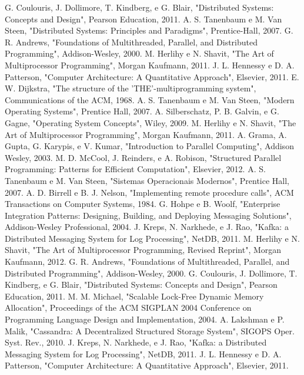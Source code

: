 \documentclass[conference]{IEEEtran}
\begin{document}
\begin{thebibliography}{00} 
     G. Coulouris, J. Dollimore, T. Kindberg, e G. Blair, "Distributed Systems: Concepts and Design", Pearson Education, 2011.
     A. S. Tanenbaum e M. Van Steen, "Distributed Systems: Principles and Paradigms", Prentice-Hall, 2007.
     G. R. Andrews, "Foundations of Multithreaded, Parallel, and Distributed Programming", Addison-Wesley, 2000.
     M. Herlihy e N. Shavit, "The Art of Multiprocessor Programming", Morgan Kaufmann, 2011.
     J. L. Hennessy e D. A. Patterson, "Computer Architecture: A Quantitative Approach", Elsevier, 2011.
     E. W. Dijkstra, "The structure of the 'THE'-multiprogramming system", Communications of the ACM, 1968.
     A. S. Tanenbaum e M. Van Steen, "Modern Operating Systems", Prentice Hall, 2007.
     A. Silberschatz, P. B. Galvin, e G. Gagne, "Operating System Concepts", Wiley, 2009.
     M. Herlihy e N. Shavit, "The Art of Multiprocessor Programming", Morgan Kaufmann, 2011.
     A. Grama, A. Gupta, G. Karypis, e V. Kumar, "Introduction to Parallel Computing", Addison Wesley, 2003.
     M. D. McCool, J. Reinders, e A. Robison, "Structured Parallel Programming: Patterns for Efficient Computation", Elsevier, 2012.
     A. S. Tanenbaum e M. Van Steen, "Sistemas Operacionais Modernos", Prentice Hall, 2007.
     A. D. Birrell e B. J. Nelson, "Implementing remote procedure calls", ACM Transactions on Computer Systems, 1984.
     G. Hohpe e B. Woolf, "Enterprise Integration Patterns: Designing, Building, and Deploying Messaging Solutions", Addison-Wesley Professional, 2004.
     J. Kreps, N. Narkhede, e J. Rao, "Kafka: a Distributed Messaging System for Log Processing", NetDB, 2011.
     M. Herlihy e N. Shavit, "The Art of Multiprocessor Programming, Revised Reprint", Morgan Kaufmann, 2012.
     G. R. Andrews, "Foundations of Multithreaded, Parallel, and Distributed Programming", Addison-Wesley, 2000.
     G. Coulouris, J. Dollimore, T. Kindberg, e G. Blair, "Distributed Systems: Concepts and Design", Pearson Education, 2011.
     M. M. Michael, "Scalable Lock-Free Dynamic Memory Allocation", Proceedings of the ACM SIGPLAN 2004 Conference on Programming Language Design and Implementation, 2004.
     A. Lakshman e P. Malik, "Cassandra: A Decentralized Structured Storage System", SIGOPS Oper. Syst. Rev., 2010.
     J. Kreps, N. Narkhede, e J. Rao, "Kafka: a Distributed Messaging System for Log Processing", NetDB, 2011.
     J. L. Hennessy e D. A. Patterson, "Computer Architecture: A Quantitative Approach", Elsevier, 2011.

\end{thebibliography}
\end{document}
